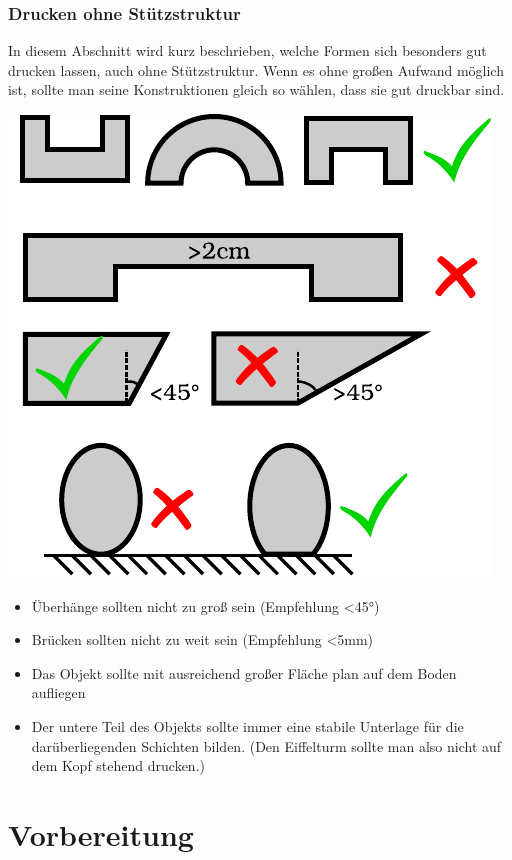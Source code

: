 \documentclass{\basedir/fablab-document}
\begin{document}
\subsubsection{Drucken ohne Stützstruktur}
In diesem Abschnitt wird kurz beschrieben, welche Formen sich besonders gut drucken lassen, auch ohne Stützstruktur. Wenn es ohne großen Aufwand möglich ist, sollte man seine Konstruktionen gleich so wählen, dass sie gut druckbar sind.
\begin{center}
\includegraphics{./zeichnungen/formen.pdf}
\end{center}
\begin{itemize}
\item Überhänge sollten nicht zu groß sein
(Empfehlung {\textless}45°)
\item Brücken sollten nicht zu weit sein (Empfehlung {\textless}5mm)
\item Das Objekt sollte mit ausreichend großer Fläche plan auf dem Boden aufliegen
\item Der untere Teil des Objekts sollte immer eine stabile Unterlage für die darüberliegenden Schichten bilden. (Den Eiffelturm sollte man also nicht auf dem Kopf stehend drucken.)
\end{itemize}

\section{Vorbereitung}
\end{document}
